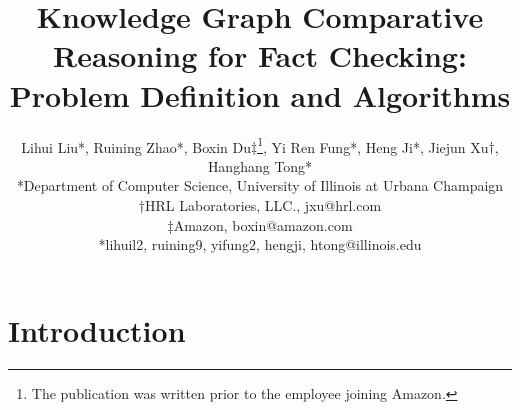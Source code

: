 \documentclass[11pt]{article}
\begin{document}
\title{Knowledge Graph Comparative Reasoning for Fact Checking: Problem Definition and Algorithms}





\author{Lihui Liu*, Ruining Zhao*,  Boxin Du$\ddagger$\footnote{The publication was written prior to the employee joining Amazon.}, Yi Ren Fung*, Heng Ji*, Jiejun Xu$\dagger$, Hanghang Tong* \\
  *Department of Computer Science, University of Illinois at Urbana Champaign \\
  $\dagger$HRL Laboratories, LLC., jxu@hrl.com \\
  $\ddagger$Amazon, boxin@amazon.com\\
  *{lihuil2, ruining9, yifung2, hengji, htong}@illinois.edu
}


%


\maketitle

\begin{abstract}

\end{abstract}



\section{Introduction}



%

%
%
\end{document}
